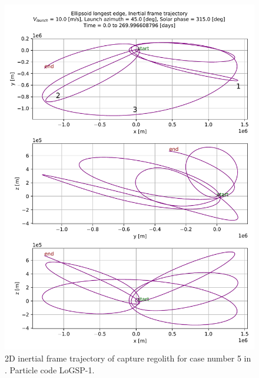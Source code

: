 \begin{figure}[htb]
\centering
\captionsetup{justification=centering}
\includegraphics[width=\linewidth, height=\textheight, keepaspectratio=true]{longest_edge_perturbations/3.2Density_1cmSize/10ms_45Azimuth_315SolarPhase/2d_trajectory_inertialFrame_edit.pdf}
\caption{2D inertial frame trajectory of capture regolith for case number 5 in . Particle code LoGSP-1.}
\label{fig:LoGSP_1_capture_case_5_2d_traj_inertialFrame}
\end{figure}
\FloatBarrier
